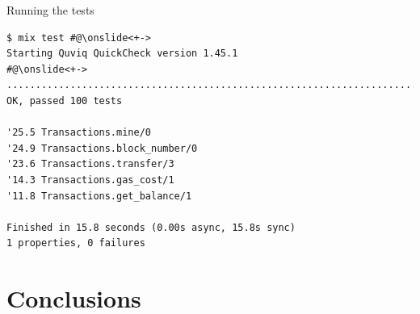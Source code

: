 \documentclass[aspectratio=169, 10pt]{beamer}
\begin{document}
\begin{frame}[label={sec:orgd5c3d32},fragile]{Running the tests}
 \onslide<+->
\onslide<+->
\lstset{language=bash,label= ,caption= ,captionpos=b,numbers=none,style=shell}
\begin{lstlisting}
$ mix test #@\onslide<+->
Starting Quviq QuickCheck version 1.45.1
#@\onslide<+->
....................................................................................................
OK, passed 100 tests

'25.5 Transactions.mine/0
'24.9 Transactions.block_number/0
'23.6 Transactions.transfer/3
'14.3 Transactions.gas_cost/1
'11.8 Transactions.get_balance/1

Finished in 15.8 seconds (0.00s async, 15.8s sync)
1 properties, 0 failures
\end{lstlisting}
\end{frame}

\section{Conclusions}
\label{sec:org5af9426}
\end{document}
